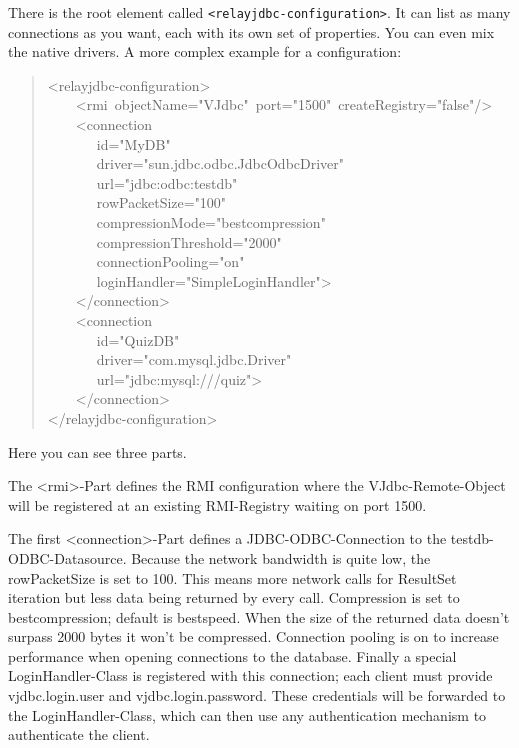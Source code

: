 \documentclass[10pt,a4paper,english]{article}
\begin{document}
There is the root element called \texttt{<relayjdbc-configuration>}. It can list as many connections as you want, each with its own set of properties. You can even mix the native drivers. A more complex example for a configuration:
\begin{quote}{\ttfamily \raggedright \noindent
<relayjdbc-configuration>~\\
~~~~<rmi~objectName="VJdbc"~port="1500"~createRegistry="false"/>~\\
~~~~<connection~\\
~~~~~~~id="MyDB"~\\
~~~~~~~driver="sun.jdbc.odbc.JdbcOdbcDriver"~\\
~~~~~~~url="jdbc:odbc:testdb"~\\
~~~~~~~rowPacketSize="100"~\\
~~~~~~~compressionMode="bestcompression"~\\
~~~~~~~compressionThreshold="2000"~\\
~~~~~~~connectionPooling="on"~\\
~~~~~~~loginHandler="SimpleLoginHandler">~\\
~~~~</connection>~\\
~~~~<connection~\\
~~~~~~~id="QuizDB"~\\
~~~~~~~driver="com.mysql.jdbc.Driver"~\\
~~~~~~~url="jdbc:mysql:///quiz">~\\
~~~~</connection>~\\
</relayjdbc-configuration>
}\end{quote}

Here you can see three parts.

The {\textless}rmi{\textgreater}-Part defines the RMI configuration where the VJdbc-Remote-Object will be registered at an existing RMI-Registry waiting on port 1500.

The first {\textless}connection{\textgreater}-Part defines a JDBC-ODBC-Connection to the testdb-ODBC-Datasource. Because the network bandwidth is quite low, the rowPacketSize is set to 100. This means more network calls for ResultSet iteration but less data being returned by every call. Compression is set to bestcompression; default is bestspeed. When the size of the returned data doesn't surpass 2000 bytes it won't be compressed. Connection pooling is on to increase performance when opening connections to the database. Finally a special LoginHandler-Class is registered with this connection; each client must provide vjdbc.login.user and vjdbc.login.password. These credentials will be forwarded to the LoginHandler-Class, which can then use any authentication mechanism to authenticate the client.
\end{document}

